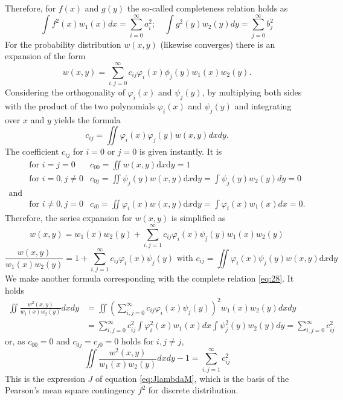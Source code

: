 \documentclass{article}
\begin{document}
Therefore, for $f(x)$ and $g(y)$ the so-called 
completeness relation holds as
\begin{equation}\label{eq:28}
    \int f^{2}(x) w_{1}(x) d x=\sum_{i=0}^{\infty} a_{i}^{2} ; \quad \int g^{2}(y) w_{2}(y) d y=\sum_{j=0}^{\infty} b_{j}^{2}
\end{equation}
For the probability distribution $w(x,y)$ (likewise converges)
there is an expansion of the form
$$
w(x,y) = \sum_{i,j=0}^{\infty}
c_{ij} \varphi_i(x) \phi_j(y)w_1(x) w_2(y).
$$
Considering the orthogonality of $\varphi_i(x)$
and $\psi_j(y)$, by multiplying both sides with the product of the two
polynomials $\varphi_i(x)$
and $\psi_j(y)$ and integrating over $x$
and $y$
yields the formula
$$
c_{ij} = \iint \varphi_i(x) \varphi_j(y) w(x,y)dxdy.
$$
The coefficient $c_{ij}$ for $i=0$ or $j=0$ is given instantly.
It is
$$
\begin{array}{lll}
&\textrm{for }i=j=0 & c_{00}=\iint w(x, y) \mathrm{d} x \mathrm{d} y=1 \\
&\textrm{for }i=0, j\neq 0 & c_{0 j}=\iint \psi_{j}(y) w(x, y) \mathrm{d} x \mathrm{d} y=\int \psi_{j}(y) w_{2}(y) d y=0 \\
\textrm{and} & & \\
&\textrm{for }i\neq0, j= 0 & c_{i 0}=\iint \varphi_{i}(x) w(x, y) \mathrm{d} x \mathrm{d} y=\int \varphi_{i}(x) w_{1}(x) d x=0.
\end{array}
$$
Therefore, the series expansion for $w(x,y)$ is simplified
as
$$
w(x, y)=w_{1}(x) w_{2}(y)+\sum_{i, j=1}^{\infty} c_{i j} \varphi_{i}(x) \psi_{j}(y) w_{1}(x) w_{2}(y)
$$
\begin{equation}\label{eq:29}
    \frac{w(x, y)}{w_{1}(x) w_{2}(y)}=1+\sum_{i, j=1}^{\infty} c_{i j} \varphi_{i}(x) \psi_{j}(y) \text { with } c_{ij}=\iint \varphi_i(x) \psi_{j}(y) w(x, y) \mathrm{d} x \mathrm{d} y
\end{equation}
We make another formula corresponding with the complete relation
\eqref{eq:28}. It holds
$$
\begin{aligned}
\iint \frac{w^{2}(x, y)}{w_{1}(x) w_{2}(y)} d x d y &=\iint\left(\sum_{i, j=0}^{\infty} c_{i j} \varphi_{i}(x) \psi_{j}(y)\right)^{2} w_{1}(x) w_{2}(y) d x d y \\
&=\sum_{i, j=0}^{\infty} c_{i j}^{2} \int \varphi_{i}^{2}(x) w_{1}(x) d x \int \psi_{j}^{2}(y) w_{2}(y) d y=\sum_{i, j=0}^{\infty} c_{i j}^{2}
\end{aligned}
$$
or, as $c_{00}=0$ and $c_{0j}=c_{j0}=0$ holds for $i,j\neq j$,
\begin{equation}
    \iint \frac{w^{2}(x, y)}{w_{1}(x) w_{2}(y)} d x d y - 1
    =\sum_{i,j=1}^{\infty} c_{ij}^2
\end{equation}
This is the expression $J$ of equation \eqref{eq:JlambdaM},
which is the basis of the Pearson's mean square contingency
$f^2$ for discrete distribution.
\end{document}
